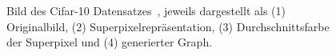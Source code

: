 \begin{figure}[t]
\centering
{}
  \caption[\gls{Cifar}-10]{Bild des \gls{Cifar}-10 Datensatzes~\cite{cifar_10}, jeweils dargestellt als (1) Originalbild, (2) Superpixelrepräsentation, (3) Durchschnittsfarbe der Superpixel und (4) generierter Graph.}
\label{fig:cifar_10}
\end{figure}
